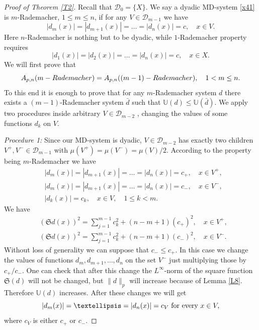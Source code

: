 \documentclass[12pt,reqno,fleqn]{amsart}
\theoremstyle{definition}
\theoremstyle{definition}
\theoremstyle{remark}
\def\ZU{\ensuremath{\mathbb U}}
\def\ZS{\ensuremath{\mathfrak S}}
\def\ZD{\ensuremath{\mathscr  D}}
\numberwithin{equation}{section}
\newcommand {\e }[1]{\eqref{#1}}
\newcommand {\lem }[1]{Lemma \ref{#1}}
\newcommand {\trm }[1]{Theorem \ref{#1}}
\begin{document}
\begin{proof}[Proof of \trm{T2}]
 Recall that $\ZD_0=\{X\}$. We say a dyadic MD-system \e{x41} is $m$-Rademacher, $1\le m\le n$,  if for any $V\in \ZD_{m-1}$ we have
\begin{equation}\label{x68}
	|d_{m}(x)|=|d_{m+1}(x)|=\ldots=|d_n(x)|=c,\quad x\in V. 
\end{equation}
Here $n$-Rademacher is nothing but to be dyadic, while $1$-Rademacher property requires 
\begin{equation}
|d_1(x)|=|d_2(x)|=\ldots =|d_n(x)|=c,\quad x\in X.
\end{equation}
We will first prove that 
\begin{equation}\label{x46}
	A_{p,n}(m-{\rm Rademacher})=A_{p,n}((m-1)-{\rm Rademacher}), \quad 1<m\le n.
\end{equation}
To this end it is enough to prove that for any $m$-Rademacher system $d$ there exists a $(m-1)$-Rademacher system $\bar d$ such that $\ZU(d)\le \ZU(\bar d)$.  
We apply two procedures inside arbitrary $V\in \ZD_{m-2}$ , changing the values of some functions $d_k$ on $V$.  

{\it Procedure 1: }Since our MD-system is dyadic, $V\in \ZD_{m-2}$ has exactly two children $V^+,V^-\in \ZD_{m-1}$ with $\mu(V^+)=\mu(V^-)=\mu(V)/2$.
According to the property being $m$-Rademacher we have
\begin{align}
	&|d_{m}(x)|=|d_{m+1}(x)|=\ldots=|d_n(x)|=c_+,\quad x\in V^+,\\
	&|d_{m}(x)|=|d_{m+1}(x)|=\ldots=|d_n(x)|=c_-,\quad x\in V^-,\\
	&|d_k(x)|=c_k,\quad x\in V,\quad 1\le k<m.
\end{align}
We have
\begin{align}
	&(\ZS d(x))^2=\sum_{j=1}^{m-1}c_k^2+(n-m+1)(c_+)^2,\quad x\in V^+,\\
	&(\ZS d(x))^2=\sum_{j=1}^{m-1}c_k^2+(n-m+1)(c_-)^2,\quad x\in V^-.
\end{align}
Without loss of generality we can suppose that $c_-\le c_+$. In this case we change the values of functions $d_m,d_{m+1},\ldots,d_n$ on the set $V^-$ just multiplying those by $c_+/c_-$. One can check that after this change the $L^\infty$-norm of the square function $\ZS(d)$ will not be changed, but $\|d\|_p$ will increase because of \lem{L8}. Therefore $\ZU(d)$ increases. After these changes we will get
\begin{equation}\label{x83}
	|d_m(x)|=\ldots= |d_n(x)|=c_V \hbox{ for every }x\in V,
\end{equation}
where $c_V$ is either $c_+$ or $c_-$.


\end{proof}
\end{document}
